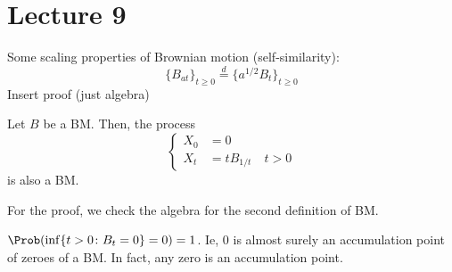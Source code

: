 \section{Lecture 9}

Some scaling properties of Brownian motion (self-similarity):
\[
\{B_{at}\}_{t \ge 0} \overset{d}{=} \{a^{1/2} B_t\}_{t \ge 0}
\]
Insert proof (just algebra)

\begin{theorem}
Let $B$ be a BM. Then, the process
\[
\begin{cases}
X_0 &= 0 \\
X_t &= tB_{1/t} \quad t > 0
\end{cases}
\]
is also a BM.
\end{theorem}
For the proof, we check the algebra for the second definition of BM.

\begin{corollary}
$\Prob( \inf\{
    t > 0 \colon B_t = 0
\} = 0) = 1$. Ie, 0 is almost surely an accumulation point of zeroes of a BM. In fact, any zero is an accumulation point.
\end{corollary}

